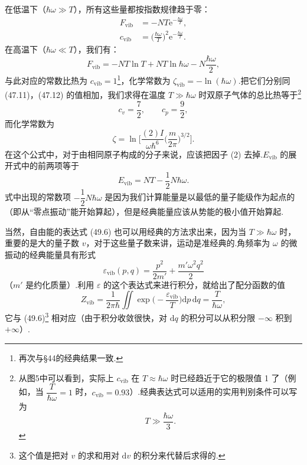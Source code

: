 在低温下（$\hbar\omega\gg T$），所有这些量都按指数规律趋于零：
\begin{equation}
\begin{aligned}
  F_{\mathrm{vib}}&=-NT\mathrm{e}^{-\frac{\hbar\omega}{T}},\\
  c_{\mathrm{vib}}&=\Big(\frac{\hbar\omega}{T}\Big)^{2}
  \mathrm{e}^{-\frac{\hbar\omega}{T}}.
\end{aligned}
\end{equation}
在高温下（$\hbar\omega\ll T$），我们有：
\begin{equation}
  F_{\mathrm{vib}}=-NT\ln T+NT\ln\hbar\omega-N\frac{\hbar\omega}{2},
\end{equation}
与此对应的常数比热为 $c_{\mathrm{vib}}=1$\footnote{再次与§44的经典结果一致.}，化学常数为 $\zeta_{\mathrm{vib}}=-\ln(\hbar\omega)$.把它们分别同 (47.11)，(47.12) 的值相加，我们求得在温度 $T\gg\hbar\omega$ 时双原子气体的总比热等于\footnote{从图5中可以看到，实际上 $c_{\mathrm{vib}}$ 在 $T\approx\hbar\omega$ 时已经趋近于它的极限值 1 了（例如，当 $\dfrac{T}{\hbar\omega}=1$ 时，$c_{\mathrm{vib}}=0.93$）.经典表达式可以适用的实用判别条件可以写为
\begin{equation*}
  T\gg\frac{\hbar\omega}{3}.
\end{equation*}}
\begin{equation}
  c_v=\frac{7}{2},\qquad c_p=\frac{9}{2},
\end{equation}
而化学常数为
\begin{equation}
  \zeta=\ln\Big[\frac{(2)I}{\omega\hbar^6}\Big(\frac{m}{2\pi}\Big)^{3/2}\Big].
\end{equation}
在这个公式中，对于由相同原子构成的分子来说，应该把因子 (2) 去掉.$E_{\mathrm{vib}}$ 的展开式中的前两项等于
\begin{equation}
  E_{\mathrm{vib}}=NT-\frac{1}{2}N\hbar\omega.
\end{equation}
式中出现的常数项 $-\dfrac{1}{2}N\hbar\omega$ 是因为我们计算能量是以最低的量子能级作为起点的（即从“零点振动”能开始算起），但是经典能量应该从势能的极小值开始算起.

当然，自由能的表达式 (49.6) 也可以用经典的方法求出来，因为当 $T\gg\hbar\omega$ 时，重要的是大的量子数 $v$，对于这些量子数来讲，运动是准经典的.角频率为 $\omega$ 的微振动的经典能量具有形式
\begin{equation*}
  \varepsilon_{\mathrm{vib}}(p,q)=\frac{p^2}{2m'}+\frac{m'\omega^2q^2}{2}
\end{equation*}
（$m'$ 是约化质量）.利用 $\varepsilon$ 的这个表达式来进行积分，就给出了配分函数的值
\begin{equation}
  Z_{\mathrm{vib}}=\frac{1}{2\pi\hbar}\iint
  \exp\Big(-\frac{\varepsilon_{\mathrm{vib}}}{T}\Big)\mathrm{d}p\,\mathrm{d}q
  =\frac{T}{\hbar\omega},
\end{equation}
它与 (49.6)\footnote{这个值是把对 $v$ 的求和用对 $\mathrm{d}v$ 的积分来代替后求得的.} 相对应（由于积分收敛很快，对 $\mathrm{d}q$ 的积分可以从积分限 $-\infty$ 积到 $+\infty$）.

